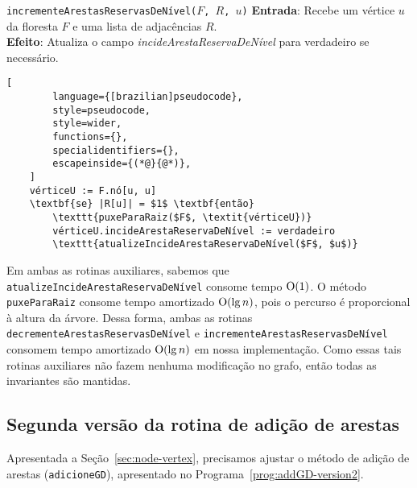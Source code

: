 \begin{programruledcaption}{\texttt{incrementeArestasReservasDeNível($F$, $R$, $u$)} \label{prog:incrementReserveEdgesCount-GD}}
    \noindent\textbf{Entrada}: Recebe um vértice $u$ da floresta $F$ e uma lista de adjacências $R$.\\
    \noindent\textbf{Efeito}: Atualiza o campo \textit{incideArestaReservaDeNível} para verdadeiro se necessário.
    \vspace{-0.5\baselineskip}
    \begin{lstlisting}[
        language={[brazilian]pseudocode},
        style=pseudocode,
        style=wider,
        functions={},
        specialidentifiers={},
        escapeinside={(*@}{@*)},
    ]
    vérticeU := F.nó[u, u]
    \textbf{se} |R[u]| = $1$ \textbf{então} 
        \texttt{puxeParaRaiz($F$, \textit{vérticeU})}
        vérticeU.incideArestaReservaDeNível := verdadeiro
        \texttt{atualizeIncideArestaReservaDeNível($F$, $u$)}
    \end{lstlisting}
    \vspace{-0.5\baselineskip}
\end{programruledcaption}


 Em ambas as rotinas auxiliares, sabemos que \texttt{atualizeIncideArestaReservaDeNível} consome tempo $\mathrm{O}(1)$. O método \texttt{puxeParaRaiz} consome tempo amortizado $\mathrm{O}(\lg n)$, pois o percurso é proporcional à altura da árvore. Dessa forma, ambas as rotinas \texttt{decrementeArestasReservasDeNível} e \texttt{incrementeArestasReservasDeNível} consomem tempo amortizado $\mathrm{O}(\lg n)$ em nossa implementação.
Como essas tais rotinas auxiliares não fazem nenhuma modificação no grafo, então todas as invariantes são mantidas. 

\subsection{Segunda versão da rotina de adição de arestas}
\label{sec:code-edge-addition-second-version}

Apresentada a Seção~\ref{sec:node-vertex}, precisamos ajustar o método de adição de arestas (\texttt{adicioneGD}), apresentado no Programa~\ref{prog:addGD-version2}. 

